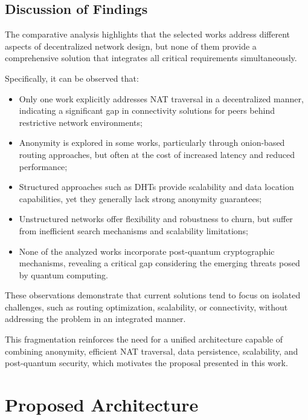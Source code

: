 \documentclass[12pt]{article}
\begin{document}
\subsection{Discussion of Findings}

The comparative analysis highlights that the selected works address different aspects of decentralized network design, but none of them provide a comprehensive solution that integrates all critical requirements simultaneously.

Specifically, it can be observed that:
\begin{itemize}
    \item Only one work explicitly addresses NAT traversal in a decentralized manner, indicating a significant gap in connectivity solutions for peers behind restrictive network environments;
    \item Anonymity is explored in some works, particularly through onion-based routing approaches, but often at the cost of increased latency and reduced performance;
    \item Structured approaches such as DHTs provide scalability and data location capabilities, yet they generally lack strong anonymity guarantees;
    \item Unstructured networks offer flexibility and robustness to churn, but suffer from inefficient search mechanisms and scalability limitations;
    \item None of the analyzed works incorporate post-quantum cryptographic mechanisms, revealing a critical gap considering the emerging threats posed by quantum computing.
\end{itemize}

These observations demonstrate that current solutions tend to focus on isolated challenges, such as routing optimization, scalability, or connectivity, without addressing the problem in an integrated manner.

This fragmentation reinforces the need for a unified architecture capable of combining anonymity, efficient NAT traversal, data persistence, scalability, and post-quantum security, which motivates the proposal presented in this work.







\section{Proposed Architecture}
\end{document}
